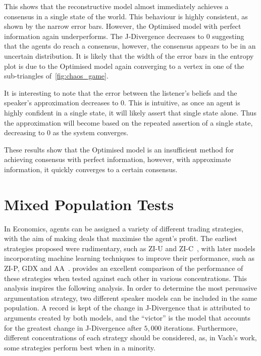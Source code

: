 This shows that the reconstructive model almost immediately achieves a consensus in a single state of the world. This behaviour is highly consistent, as shown by the narrow error bars. However, the Optimised model with perfect information again underperforms. The J-Divergence decreases to $0$ suggesting that the agents do reach a consensus, however, the consensus appears to be in an uncertain distribution. It is likely that the width of the error bars in the entropy plot is due to the Optimised model again converging to a vertex in one of the sub-triangles of~\cref{fig:chaos_game}. 

It is interesting to note that the error between the listener's beliefs and the speaker's approximation decreases to $0$. This is intuitive, as once an agent is highly confident in a single state, it will likely assert that single state alone. Thus the approximation will become based on the repeated assertion of a single state, decreasing to $0$ as the system converges. 

These results show that the Optimised model is an insufficient method for achieving consensus with perfect information, however, with approximate information, it quickly converges to a certain consensus. 



\section{Mixed Population Tests} \label{sect:pop_tests}

In Economics, agents can be assigned a variety of different trading strategies, with the aim of making deals that maximise the agent's profit. The earliest strategies proposed were rudimentary, such as ZI-U and ZI-C~\cite{Gode1993AllocativeRationality}, with later models incorporating machine learning techniques to improve their performance, such as ZI-P, GDX and AA~\cite{Cliff1997Minimal-IntelligenceEnvironments, Gjerstad1998PriceAuctions, Vytelingum2006TheAuction}. \cite{Vach2015ComparisonAgents} provides an excellent comparison of the performance of these strategies when tested against each other in various concentrations. This analysis inspires the following analysis. In order to determine the most persuasive argumentation strategy, two different speaker models can be included in the same population. A record is kept of the change in J-Divergence that is attributed to arguments created by both models, and the ``victor'' is the model that accounts for the greatest change in J-Divergence after $5,000$ iterations. Furthermore, different concentrations of each strategy should be considered, as, in Vach's work, some strategies perform best when in a minority. 

